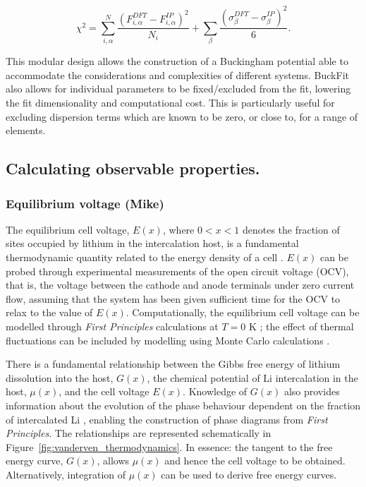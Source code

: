 \documentclass[../main.tex]{subfiles}
\begin{document}
\begin{equation}
    \chi^2 = \sum^{N}_{i,\alpha} \frac{(F^{DFT}_{i,\alpha} - F^{IP}_{i,\alpha})^2}{N_i} +  \sum_{\beta} \frac{(\sigma^{DFT}_{\beta} - \sigma^{IP}_{\beta})^2}{6}.
\end{equation}

This modular design allows the construction of a Buckingham potential able to accommodate the considerations and complexities of different systems. BuckFit also allows for individual parameters to be fixed/excluded from the fit, lowering the fit dimensionality and computational cost. This is particularly useful for excluding dispersion terms which are known to be zero, or close to, for a range of elements. \cite{Lee2013_lithium,fisher2008lithium}

\subsection{Calculating observable properties.}
\subsubsection{Equilibrium voltage (Mike)}
\label{sec:properties_equilibriumvoltage}
The equilibrium cell voltage, $E(x)$, where $0 < x < 1$ denotes the fraction of sites occupied by lithium in the intercalation host, is a fundamental thermodynamic quantity related to the energy density of a cell \cite{Urban2016,CEDER1999131,VanderVen2020}. $E(x)$ can be probed through experimental measurements of the open circuit voltage (OCV), that is, the voltage between the cathode and anode terminals under zero current flow, assuming that the system has been given sufficient time for the OCV to relax to the value of $E(x)$. Computationally, the equilibrium cell voltage can be modelled through \textit{First Principles} calculations at $T = 0$ K \cite{Urban2016,CEDER1999131,VanderVen2020}; the effect of thermal fluctuations can be included by modelling using Monte Carlo calculations \cite{mercer_influence_2017,Kim2001h}.

There is a fundamental relationship between the Gibbs free energy of lithium dissolution into the host, $G(x)$, the chemical potential of Li intercalation in the host, $\mu(x)$, and the cell voltage $E(x)$. Knowledge of $G(x)$ also provides information about the evolution of the phase behaviour dependent on the fraction of intercalated Li \cite{CEDER1999131,persson2010,VanderVen2020,VanDerVen2000b}, enabling the construction of phase diagrams from \textit{First Principles}. The relationships are represented schematically in Figure~\ref{fig:vanderven_thermodynamics}. In essence: the tangent to the free energy curve, $G(x)$, allows $\mu(x)$ and hence the cell voltage to be obtained. Alternatively, integration of $\mu(x)$ can be used to derive free energy curves. 
\end{document}
